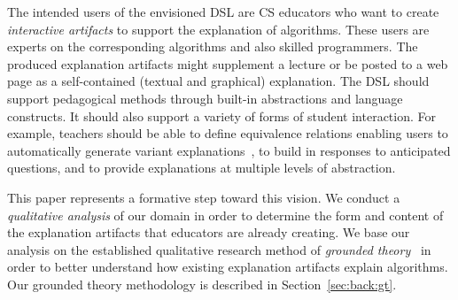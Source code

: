 \documentclass[sigconf]{acmart}
\begin{document}
The intended users of the envisioned DSL are CS educators who want to create
\emph{interactive artifacts} to support the explanation of algorithms. These
users are experts on the corresponding algorithms and also skilled
programmers. The produced explanation artifacts might supplement a lecture or
be posted to a web page as a self-contained (textual and graphical)
explanation.
%
The DSL should support pedagogical methods through built-in
abstractions and language constructs. It should also support a variety of forms
of student interaction. For example, teachers should be able to define
equivalence relations enabling users to automatically generate variant
explanations~\cite{EW13jvlc}, to build in responses to anticipated
questions, and to provide explanations at multiple levels of abstraction.


This paper represents a formative step toward this vision. We conduct a
\emph{qualitative analysis} of our domain in order to determine the form and
content of the explanation artifacts that educators are already creating.
%
We base our analysis on the established qualitative research method of
\emph{grounded theory}~\cite{Strauss67discoveryof} in order to better understand
how existing explanation artifacts explain algorithms. Our grounded theory
methodology is described in Section~\ref{sec:back:gt}.
\end{document}
